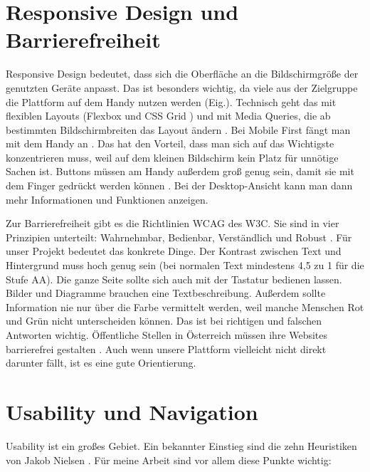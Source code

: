 \section{Responsive Design und Barrierefreiheit}
 

Responsive Design bedeutet, dass sich die Oberfläche an die Bildschirmgröße der genutzten Geräte anpasst. Das ist besonders wichtig, da viele aus der Zielgruppe die Plattform auf dem Handy nutzen werden (Eig.). Technisch geht das mit flexiblen Layouts (Flexbox und CSS Grid \parencite{mdnLayout}) und mit Media Queries, die ab bestimmten Bildschirmbreiten das Layout ändern \parencite{marcotte2010}. Bei Mobile First fängt man mit dem Handy an \parencite{wroblewski2011}. Das hat den Vorteil, dass man sich auf das Wichtigste konzentrieren muss, weil auf dem kleinen Bildschirm kein Platz für unnötige Sachen ist. Buttons müssen am Handy außerdem groß genug sein, damit sie mit dem Finger gedrückt werden können \parencite{wcag22}. Bei der Desktop-Ansicht kann man dann mehr Informationen und Funktionen anzeigen.

Zur Barrierefreiheit gibt es die Richtlinien WCAG des W3C. Sie sind in vier Prinzipien unterteilt: Wahrnehmbar, Bedienbar, Verständlich und Robust \parencite{wcag22}. Für unser Projekt bedeutet das konkrete Dinge. Der Kontrast zwischen Text und Hintergrund muss hoch genug sein (bei normalen Text mindestens 4,5 zu 1 für die Stufe AA). Die ganze Seite sollte sich auch mit der Tastatur bedienen lassen. Bilder und Diagramme brauchen eine Textbeschreibung. Außerdem sollte Information nie nur über die Farbe vermittelt werden, weil manche Menschen Rot und Grün nicht unterscheiden können. Das ist bei richtigen und falschen Antworten wichtig. Öffentliche Stellen in Österreich müssen ihre Websites barrierefrei gestalten \parencite{wzg2019}. Auch wenn unsere Plattform vielleicht nicht direkt darunter fällt, ist es eine gute Orientierung.
 
\section{Usability und Navigation}
 

Usability ist ein großes Gebiet. Ein bekannter Einstieg sind die zehn Heuristiken von Jakob Nielsen \parencite{nielsen1994}. Für meine Arbeit sind vor allem diese Punkte wichtig:
 
